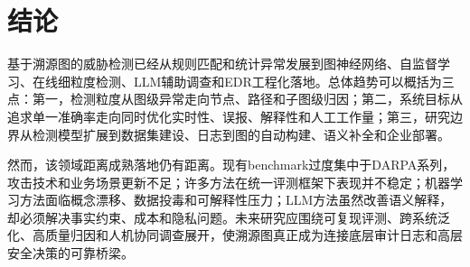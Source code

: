 \chapter{结论}

基于溯源图的威胁检测已经从规则匹配和统计异常发展到图神经网络、自监督学习、在线细粒度检测、LLM辅助调查和EDR工程化落地。总体趋势可以概括为三点：第一，检测粒度从图级异常走向节点、路径和子图级归因；第二，系统目标从追求单一准确率走向同时优化实时性、误报、解释性和人工工作量；第三，研究边界从检测模型扩展到数据集建设、日志到图的自动构建、语义补全和企业部署。

然而，该领域距离成熟落地仍有距离。现有benchmark过度集中于DARPA系列，攻击技术和业务场景更新不足；许多方法在统一评测框架下表现并不稳定；机器学习方法面临概念漂移、数据投毒和可解释性压力；LLM方法虽然改善语义解释，却必须解决事实约束、成本和隐私问题。未来研究应围绕可复现评测、跨系统泛化、高质量归因和人机协同调查展开，使溯源图真正成为连接底层审计日志和高层安全决策的可靠桥梁。
